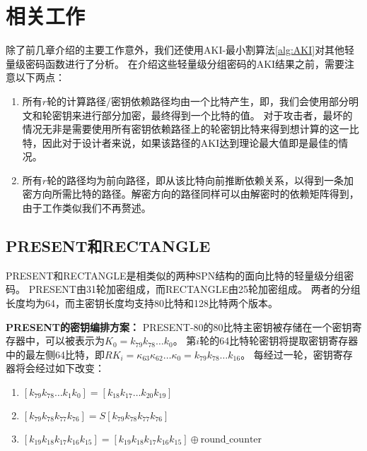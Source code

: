 
\chapter{相关工作}
\label{chap:Work}
除了前几章介绍的主要工作意外，我们还使用AKI-最小割算法\ref{alg:AKI}对其他轻量级密码函数进行了分析。
在介绍这些轻量级分组密码的AKI结果之前，需要注意以下两点：
\begin{enumerate}
    \item 所有$r$轮的计算路径/密钥依赖路径均由一个比特产生，即，我们会使用部分明文和轮密钥来进行部分加密，最终得到一个比特的值。
        对于攻击者，最坏的情况无非是需要使用所有密钥依赖路径上的轮密钥比特来得到想计算的这一比特，因此对于设计者来说，如果该路径的AKI达到理论最大值即是最佳的情况。
    \item 所有$r$轮的路径均为前向路径，即从该比特向前推断依赖关系，以得到一条加密方向所需比特的路径。解密方向的路径同样可以由解密时的依赖矩阵得到，由于工作类似我们不再赘述。
\end{enumerate}

\section{PRESENT和RECTANGLE}
PRESENT和RECTANGLE是相类似的两种SPN结构的面向比特的轻量级分组密码。
PRESENT由31轮加密组成，而RECTANGLE由25轮加密组成。
两者的分组长度均为64，而主密钥长度均支持80比特和128比特两个版本。

\textbf{PRESENT的密钥编排方案：}
PRESENT-80的80比特主密钥被存储在一个密钥寄存器中，可以被表示为$K_0=k_{79}k_{78}\dots k_0$。
第$i$轮的64比特轮密钥将提取密钥寄存器中的最左侧64比特，即$RK_i=\kappa_{63}\kappa_{62}\dots\kappa_{0}=k_{79}k_{78}\dots k_{16}$。
每经过一轮，密钥寄存器将会经过如下改变：
\begin{enumerate}
    \item $[k_{79}k_{78}\dots k_1k_0]=[k_{18}k_{17}\dots k_{20}k_{19}]$
    \item $[k_{79}k_{78}k_{77}k_{76}]=S[k_{79}k_{78}k_{77}k_{76}]$
    \item $[k_{19}k_{18}k_{17}k_{16}k_{15}]=[k_{19}k_{18}k_{17}k_{16}k_{15}]\oplus\mbox{round\_counter}$
\end{enumerate}

